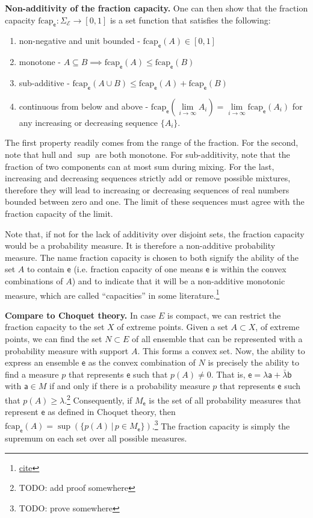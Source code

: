 \documentclass[10pt,twocolumn, nofootinbib]{revtex4-2}
\newcommand\hull{\mathrm{hull}}
\newcommand\frcap{\mathrm{fcap}}
\newcommand{\ens}[1][e] {\mathsf{#1}} %
\newcommand{\Ens}[1][E] {\mathcal{#1}} %
\begin{document}
\textbf{Non-additivity of the fraction capacity.} One can then show that the fraction capacity $\frcap_{\ens} : \Sigma_{\Ens} \to [0,1]$ is a set function that satisfies the following:
\begin{enumerate}
	\item non-negative and unit bounded - $\frcap_{\ens}(A) \in [0,1]$
	\item monotone - $A \subseteq B \implies \frcap_{\ens}(A) \leq \frcap_{\ens}(B)$
	\item sub-additive - $\frcap_{\ens}(A \cup B) \leq \frcap_{\ens}(A) + \frcap_{\ens}(B)$
	\item continuous from below and above - $\frcap_{\ens}(\lim\limits_{i \to \infty} A_i) = \lim\limits_{i \to \infty} \frcap_{\ens}(A_i)$ for any increasing or decreasing sequence $\{A_i\}$.
\end{enumerate}

The first property readily comes from the range of the fraction. For the second, note that $\hull$ and $\sup$ are both monotone. For sub-additivity, note that the fraction of two components can at most sum during mixing. For the last, increasing and decreasing sequences strictly add or remove possible mixtures, therefore they will lead to increasing or decreasing sequences of real numbers bounded between zero and one. The limit of these sequences must agree with the fraction capacity of the limit.

Note that, if not for the lack of additivity over disjoint sets, the fraction capacity would be a probability measure. It is therefore a non-additive probability measure. The name fraction capacity is chosen to both signify the ability of the set $A$ to contain $\ens$ (i.e. fraction capacity of one means $\ens$ is within the convex combinations of $A$) and to indicate that it will be a non-additive monotonic measure, which are called ``capacities'' in some literature.\footnote{ \href{ https://link.springer.com/book/10.1007/978-3-319-03155-2}{cite} }

\textbf{Compare to Choquet theory.} In case $E$ is compact, we can restrict the fraction capacity to the set $X$ of extreme points. Given a set $A \subset X$, of extreme points, we can find the set $N \subset E$ of all ensemble that can be represented with a probability measure with support $A$. This forms a convex set. Now, the ability to express an ensemble $\ens$ as the convex combination of $N$ is precisely the ability to find a measure $p$ that represents $\ens$ such that $p(A) \neq 0$. That is, $\ens = \lambda \ens[a] + \bar{\lambda} \ens[b]$ with $\ens[a] \in M$ if and only if there is a probability measure $p$ that represents $\ens$ such that $p(A) \geq \lambda$.\footnote{TODO: add proof somewhere} Consequently, if $M_{\ens}$ is the set of all probability measures that represent $\ens$ as defined in Choquet theory, then $\frcap_{\ens}(A) = \sup(\{p(A) \, | \, p \in M_{\ens}\})$.\footnote{TODO: prove somewhere} The fraction capacity is simply the supremum on each set over all possible measures.
\end{document}
